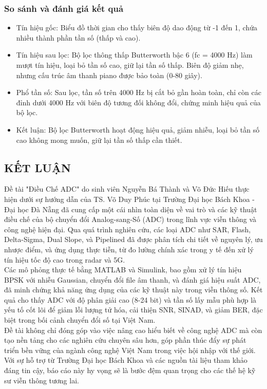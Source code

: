 \documentclass[a4paper,13pt]{article}
\begin{document}
\subsubsection*{So sánh và đánh giá kết quả}
\begin{itemize}
    \item Tín hiệu gốc: Biểu đồ thời gian cho thấy biên độ dao động từ -1 đến 1, chứa nhiều thành phần tần số (thấp và cao).
    \item Tín hiệu sau lọc: Bộ lọc thông thấp Butterworth bậc 6 (fc = 4000 Hz) làm mượt tín hiệu, loại bỏ tần số cao, giữ lại tần số thấp. Biên độ giảm nhẹ, nhưng cấu trúc âm thanh piano được bảo toàn (0-80 giây).
    \item Phổ tần số: Sau lọc, tần số trên 4000 Hz bị cắt bỏ gần hoàn toàn, chỉ còn các đỉnh dưới 4000 Hz với biên độ tương đối không đổi, chứng minh hiệu quả của bộ lọc.
    \item Kết luận: Bộ lọc Butterworth hoạt động hiệu quả, giảm nhiễu, loại bỏ tần số cao không mong muốn, giữ lại tần số thấp cần thiết.
\end{itemize}
\clearpage
\begin{center}
    \section{KẾT LUẬN}
\end{center}
Đề tài "Điều Chế ADC" do sinh viên Nguyễn Bá Thành và Võ Đức Hiếu thực hiện dưới sự hướng dẫn của TS. Võ Duy Phúc tại Trường Đại học Bách Khoa - Đại học Đà Nẵng đã cung cấp một cái nhìn toàn diện về vai trò và các kỹ thuật điều chế của bộ chuyển đổi Analog-sang-Số (ADC) trong lĩnh vực viễn thông và công nghệ hiện đại. Qua quá trình nghiên cứu, các loại ADC như SAR, Flash, Delta-Sigma, Dual Slope, và Pipelined đã được phân tích chi tiết về nguyên lý, ưu nhược điểm, và ứng dụng thực tiễn, từ đo lường chính xác trong y tế đến xử lý tín hiệu tốc độ cao trong radar và 5G.\\

Các mô phỏng thực tế bằng MATLAB và Simulink, bao gồm xử lý tín hiệu BPSK với nhiễu Gaussian, chuyển đổi file âm thanh, và đánh giá hiệu suất ADC, đã minh chứng khả năng ứng dụng của các kỹ thuật này trong viễn thông số. Kết quả cho thấy ADC với độ phân giải cao (8-24 bit) và tần số lấy mẫu phù hợp là yếu tố cốt lõi để giảm lỗi lượng tử hóa, cải thiện SNR, SINAD, và giảm BER, đặc biệt trong bối cảnh chuyển đổi số tại Việt Nam.\\

Đề tài không chỉ đóng góp vào việc nâng cao hiểu biết về công nghệ ADC mà còn tạo nền tảng cho các nghiên cứu chuyên sâu hơn, góp phần thúc đẩy sự phát triển bền vững của ngành công nghệ Việt Nam trong việc hội nhập với thế giới. Với sự hỗ trợ từ Trường Đại học Bách Khoa và các nguồn tài liệu tham khảo đáng tin cậy, báo cáo này hy vọng sẽ là bước đệm quan trọng cho các thế hệ kỹ sư viễn thông tương lai.\\
\end{document}
